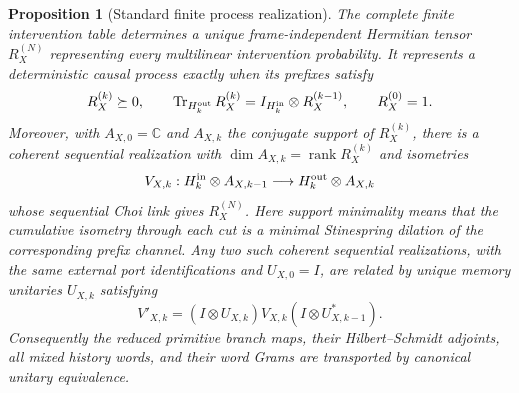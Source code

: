 \documentclass[11pt]{article}
\newtheorem{proposition}[proposition]{Proposition}
\theoremstyle{definition}
\theoremstyle{remark}
\theoremstyle{definition}
\theoremstyle{remark}
\newcommand{\rank}{\operatorname{rank}}
\begin{document}
\begin{proposition}[Standard finite process realization]
\label{thm:ncg-comb-tomography}
\label{thm:ncg-minimal-comb-dilation}
The complete finite intervention table determines a unique frame-independent
Hermitian tensor $R_X^{(N)}$ representing every multilinear intervention
probability.  It represents a deterministic causal process exactly when its prefixes
satisfy
\begin{equation}
 R_X^{(k)}\succeq0,
 \qquad
 \operatorname{Tr}_{H_k^{\rm out}}R_X^{(k)}
 =I_{H_k^{\rm in}}\otimes R_X^{(k-1)},
 \qquad R_X^{(0)}=1.
 \label{eq:ncg-comb-causality}
\end{equation}
Moreover, with $A_{X,0}=\mathbb C$ and $A_{X,k}$ the conjugate support of
$R_X^{(k)}$, there is a coherent sequential realization with
$\dim A_{X,k}=\rank R_X^{(k)}$ and isometries
\begin{equation}
 V_{X,k}:H_k^{\rm in}\otimes A_{X,k-1}
 \longrightarrow H_k^{\rm out}\otimes A_{X,k}
 \label{eq:ncg-minimal-isometries}
\end{equation}
whose sequential Choi link gives $R_X^{(N)}$.  Here \emph{support minimality}
means that the cumulative isometry through each cut is a minimal Stinespring
dilation of the corresponding prefix channel.  Any two such coherent sequential
realizations, with the same external port identifications and $U_{X,0}=I$, are
related by unique memory unitaries $U_{X,k}$ satisfying
\begin{equation}
 V'_{X,k}=(I\otimes U_{X,k})V_{X,k}(I\otimes U_{X,k-1}^*).
 \label{eq:ncg-minimal-unitary-covariance}
\end{equation}
Consequently the reduced primitive branch maps, their Hilbert--Schmidt adjoints, all
mixed history words, and their word Grams are transported by canonical unitary
equivalence.
\end{proposition}
\end{document}
